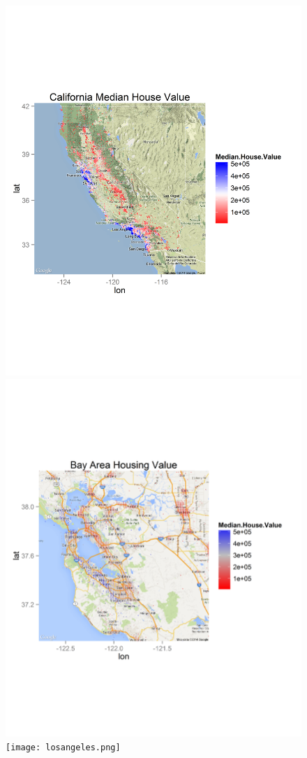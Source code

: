 \documentclass[letter]{article}
\begin{document}
\newpage
\begin{figure}[H]
\includegraphics[scale=.54]{california.png}
\includegraphics[scale=.54]{bayarea.png}
\texttt{[image: losangeles.png]}
\end{figure}
\end{document}
